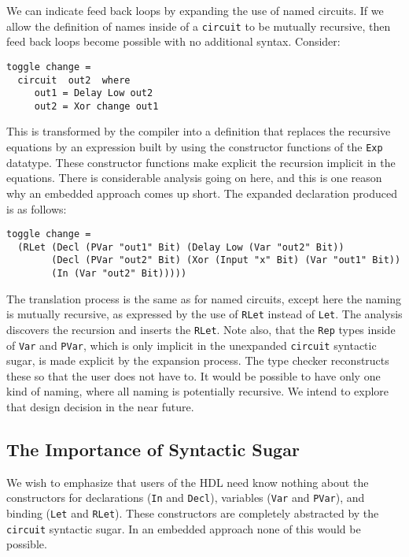 \documentclass[10pt,twoside]{article}
\begin{document}
We can indicate feed back loops by expanding the
use of named circuits. If we allow the definition of names
inside of a {\tt circuit} to be mutually recursive, then feed back loops
become possible with no additional syntax. Consider:
\begin{verbatim}
toggle change = 
  circuit  out2  where
     out1 = Delay Low out2
     out2 = Xor change out1
\end{verbatim}

This is transformed by the compiler into a definition that replaces the
recursive equations by an expression built by using the constructor
functions of the {\tt Exp} datatype. These constructor functions
make explicit the recursion implicit in the equations. There
is considerable analysis going on here, and this is one reason
why an embedded approach comes up short. The expanded declaration
produced is as follows:

\begin{verbatim}
toggle change = 
  (RLet (Decl (PVar "out1" Bit) (Delay Low (Var "out2" Bit)) 
        (Decl (PVar "out2" Bit) (Xor (Input "x" Bit) (Var "out1" Bit)) 
        (In (Var "out2" Bit)))))
\end{verbatim}

The translation process is the same as for named circuits, except here the 
naming is mutually recursive, as expressed by the use of {\tt RLet}
instead of {\tt Let}. The analysis discovers the recursion and
inserts the {\tt RLet}. Note also, that the {\tt Rep} types inside of
{\tt Var} and {\tt PVar}, which is only implicit in the unexpanded 
{\tt circuit} syntactic sugar, is made explicit by the expansion process.
The type checker reconstructs these so that the user does not have to.
It would be possible to have only one kind of
naming, where all naming is potentially recursive. We intend to
explore that design decision in the near future.

\subsection{The Importance of Syntactic Sugar}

We wish to emphasize that users of the HDL need know nothing about the constructors
for declarations ({\tt In} and {\tt Decl}), variables ({\tt Var} and {\tt PVar}),
and binding ({\tt Let} and {\tt RLet}). These constructors are
completely abstracted by the {\tt circuit} syntactic sugar. In an embedded
approach none of this would be possible.
\end{document}
